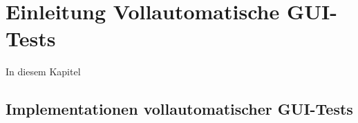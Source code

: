 \chapter{Einleitung Vollautomatische GUI-Tests}\label{chapter:introfullautoguitesting}


In diesem Kapitel


\section{Implementationen vollautomatischer GUI-Tests}\label{section:fullautoguitestsimpl}


